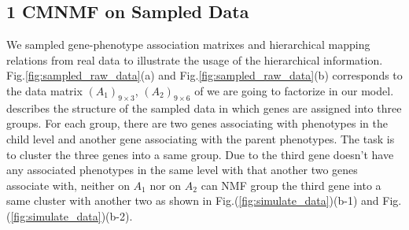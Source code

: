 \documentclass{bmcart}
\begin{document}
\subsection*{\textbf{1 CMNMF on Sampled Data}}
We sampled gene-phenotype association matrixes and hierarchical mapping relations from real data to illustrate the usage of the hierarchical information. Fig.\ref{fig:sampled_raw_data}(a) and Fig.\ref{fig:sampled_raw_data}(b) corresponds to the data matrix $(A_1)_{9\times3}$, $(A_2)_{9\times6}$ of we are going to factorize in our model.  describes the structure of the sampled data in which genes are assigned into three groups. For each group, there are two genes associating with phenotypes in the child level and another gene associating with the parent phenotypes. The task is to cluster the three genes into a same group. Due to the third gene doesn't have any associated phenotypes in the same level with that another two genes associate with, neither on $A_1$ nor on $A_2$ can NMF group the third gene into a same cluster with another two as shown in Fig.(\ref{fig:simulate_data})(b-1) and Fig.(\ref{fig:simulate_data})(b-2).
\end{document}
